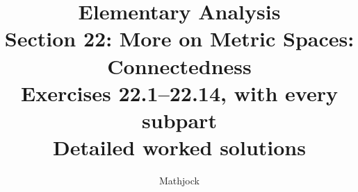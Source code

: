 
\title{\textbf{Elementary Analysis}\\[0.3em]
Section 22: More on Metric Spaces: Connectedness\\[0.4em]
\large Exercises 22.1--22.14, with every subpart\\
Detailed worked solutions}
\author{Mathjock}
\date{}

\maketitle
\bookinfo
\tableofcontents
\clearpage
\setcounter{section}{21}


